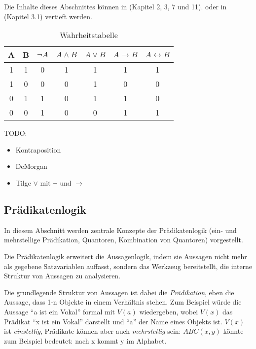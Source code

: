 Die Inhalte dieses Abschnittes können in \cite{link} (Kapitel 2, 3, 7 und 11).
oder in \cite{hoffmann} (Kapitel 3.1)
vertieft werden.

\begin{table}[ht]
    \caption{Wahrheitstabelle}
    \centering
    \begin{tabular}{|c|c|c|c|c|c|c|}
    \hline
          A
        & B
        & $\neg A$
        & $A \wedge B$
        & $A \vee B$
        & $A \rightarrow B$
        & $A \leftrightarrow B$
        \\
        \hline
          1
        & 1
        & 0
        & 1
        & 1
        & 1
        & 1
        \\
        \hline
          1
        & 0
        & 0
        & 0
        & 1
        & 0
        & 0
        \\
        \hline
          0
        & 1
        & 1
        & 0
        & 1
        & 1
        & 0
        \\
        \hline
          0
        & 0
        & 1
        & 0
        & 0
        & 1
        & 1
        \\

    \hline
    \end{tabular}
    \label{tab:al}
\end{table}

TODO:
\begin{itemize}
    \item Kontraposition
    \item DeMorgan
    \item Tilge $\vee$ mit $\neg$ und $\rightarrow$
\end{itemize}


\subsection{Prädikatenlogik}\label{pl}

In diesem Abschnitt werden zentrale Konzepte der Prädikatenlogik
(ein- und mehrstellige Prädikation, Quantoren, Kombination von Quantoren)
vorgestellt.

Die Prädikatenlogik erweitert die Aussagenlogik,
indem sie Aussagen nicht mehr als gegebene Satzvariablen auffasst,
sondern das Werkzeug bereitstellt,
die interne Struktur von Aussagen zu analysieren.

Die grundlegende Struktur von Aussagen ist dabei die \emph{Prädikation},
eben die Aussage, dass 1-n Objekte in einem Verhältnis stehen.
Zum Beispiel würde die Aussage
``a ist ein Vokal'' formal mit $V(a)$ wiedergeben,
wobei $V(x)$ das Prädikat ``x ist ein Vokal'' darstellt
und ``a'' der Name eines Objekts ist.
$V(x)$ ist \emph{einstellig},
Prädikate können aber auch \emph{mehrstellig} sein:
$ABC(x,y)$ könnte zum Beispiel bedeutet: nach x kommt y im Alphabet.


